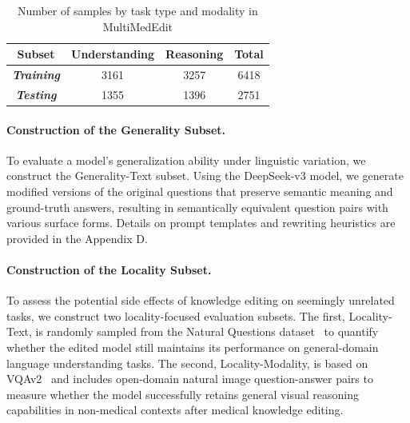 \documentclass[letterpaper]{article} %
\begin{document}
\begin{table}[ht]

    \centering    

    \begin{tabular}{lccc}
        \toprule[1.5pt]
        \multicolumn{1}{c}{\textbf{Subset}} & 
        \multicolumn{1}{c}{\textbf{Understanding}} & 
        \multicolumn{1}{c}{\textbf{Reasoning}} & 
        \multicolumn{1}{c}{\textbf{Total}} \\
        \midrule
        \multicolumn{1}{c}{\textbf{\textit{Training}}} & 
        \multicolumn{1}{c}{3161} & 
        \multicolumn{1}{c}{3257} & 
        \multicolumn{1}{c}{6418} \\
        \multicolumn{1}{c}{\textbf{\textit{Testing}}} & 
        \multicolumn{1}{c}{1355} & 
        \multicolumn{1}{c}{1396} & 
        \multicolumn{1}{c}{2751} \\
        \bottomrule[1.5pt]
    \end{tabular}
    \caption{Number of samples by task type and modality in MultiMedEdit}
    \label{tab:table1}
\end{table}


\paragraph{Construction of the Generality Subset.}
To evaluate a model’s generalization ability under linguistic variation, we construct the Generality-Text subset. Using the DeepSeek-v3 model, we generate modified versions of the original questions that preserve semantic meaning and ground-truth answers, resulting in semantically equivalent question pairs with various surface forms. Details on prompt templates and rewriting heuristics are provided in the Appendix D.







\paragraph{Construction of the Locality Subset.}
To assess the potential side effects of knowledge editing on seemingly unrelated tasks, we construct two locality-focused evaluation subsets. The first, Locality-Text, is randomly sampled from the Natural Questions dataset~\citep{kwiatkowski2019natural} to quantify whether the edited model still maintains its performance on general-domain language understanding tasks. The second, Locality-Modality, is based on VQAv2~\citep{antol2015vqa} and includes open-domain natural image question-answer pairs to measure whether the model successfully retains general visual reasoning capabilities in non-medical contexts after medical knowledge editing.
\end{document}
